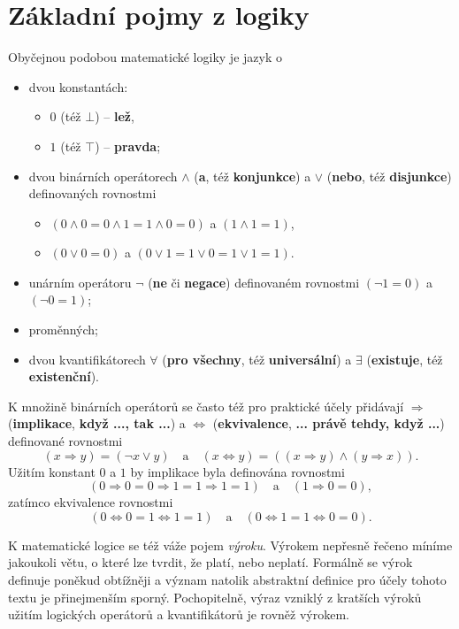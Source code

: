 \section{Základní pojmy z logiky}
\label{sec:zakladni-pojmy-z-logiky}

Obyčejnou podobou matematické logiky je jazyk o
\begin{itemize}
 \item dvou konstantách:
  \begin{itemize}
   \item $0$ (též $\bot$) -- \textbf{lež},
   \item $1$ (též $\top$) -- \textbf{pravda};
  \end{itemize}
 \item dvou binárních operátorech $ \wedge $ (\textbf{a}, též
  \textbf{konjunkce}) a $ \vee $ (\textbf{nebo}, též \textbf{disjunkce})
  definovaných rovnostmi
  \begin{itemize}
   \item $(0 \wedge 0 = 0 \wedge 1 = 1 \wedge 0 = 0)$ a $(1 \wedge 1 = 1)$,
   \item $(0 \vee 0 = 0)$ a $(0 \vee 1 = 1 \vee 0 = 1 \vee 1 = 1)$.
  \end{itemize}
 \item unárním operátoru $\neg $ (\textbf{ne} či \textbf{negace}) definovaném
  rovnostmi $(\neg 1 = 0)$ a $(\neg 0 = 1)$;
 \item proměnných;
 \item dvou kvantifikátorech $ \forall $ (\textbf{pro všechny}, též
  \textbf{universální}) a $ \exists $ (\textbf{existuje}, též
  \textbf{existenční}).
\end{itemize}

K množině binárních operátorů se často též pro praktické účely přidávají $
\Rightarrow $ (\textbf{impli\-kace}, \textbf{když ..., tak ...}) a $
\Leftrightarrow $ (\textbf{ekvivalence}, \textbf{... právě tehdy, když ...})
definované rovnostmi
\[
 (x \Rightarrow y) = (\neg x \vee y) \quad \text{a} \quad (x \Leftrightarrow y)
 = ((x \Rightarrow y) \wedge (y \Rightarrow x)).
\]
Užitím konstant $0$ a $1$ by implikace byla definována rovnostmi
\[
 (0 \Rightarrow 0 = 0 \Rightarrow 1 = 1 \Rightarrow 1 = 1) \quad \text{a} \quad
 (1 \Rightarrow 0 = 0),
\]
zatímco ekvivalence rovnostmi
\[
 (0 \Leftrightarrow 0 = 1 \Leftrightarrow 1 = 1) \quad \text{a} \quad (0
 \Leftrightarrow 1 = 1 \Leftrightarrow 0 = 0).
\]

K matematické logice se též váže pojem \emph{výroku}. Výrokem nepřesně řečeno
míníme jakoukoli větu, o které lze tvrdit, že platí, nebo neplatí. Formálně se
výrok definuje poněkud obtížněji a význam natolik abstraktní definice pro účely
tohoto textu je přinejmenším sporný. Pochopitelně, výraz vzniklý z kratších
výroků užitím logických operátorů a kvantifikátorů je rovněž výrokem.

